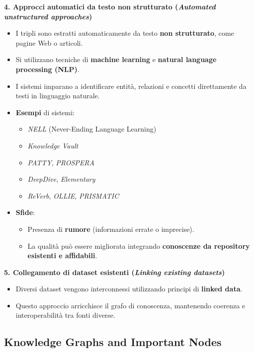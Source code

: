 \vspace{1em}
\textbf{4. Approcci automatici da testo non strutturato (\textit{Automated unstructured approaches})}
\begin{itemize}
  \item I tripli sono estratti automaticamente da testo \textbf{non strutturato}, come pagine Web o articoli.
  \item Si utilizzano tecniche di \textbf{machine learning} e \textbf{natural language processing (NLP)}.
  \item I sistemi imparano a identificare entità, relazioni e concetti direttamente da testi in linguaggio naturale.
  \item \textbf{Esempi} di sistemi:
  \begin{itemize}
    \item \textit{NELL} (Never-Ending Language Learning)
    \item \textit{Knowledge Vault}
    \item \textit{PATTY}, \textit{PROSPERA}
    \item \textit{DeepDive}, \textit{Elementary}
    \item \textit{ReVerb}, \textit{OLLIE}, \textit{PRISMATIC}
  \end{itemize}
  \item \textbf{Sfide}:
  \begin{itemize}
    \item Presenza di \textbf{rumore} (informazioni errate o imprecise).
    \item La qualità può essere migliorata integrando \textbf{conoscenze da repository esistenti e affidabili}.
  \end{itemize}
\end{itemize}

\vspace{1em}
\textbf{5. Collegamento di dataset esistenti (\textit{Linking existing datasets})}
\begin{itemize}
  \item Diversi dataset vengono interconnessi utilizzando principi di \textbf{linked data}.
  \item Questo approccio arricchisce il grafo di conoscenza, mantenendo coerenza e interoperabilità tra fonti diverse.
\end{itemize}

\subsection{Knowledge Graphs and Important Nodes}

